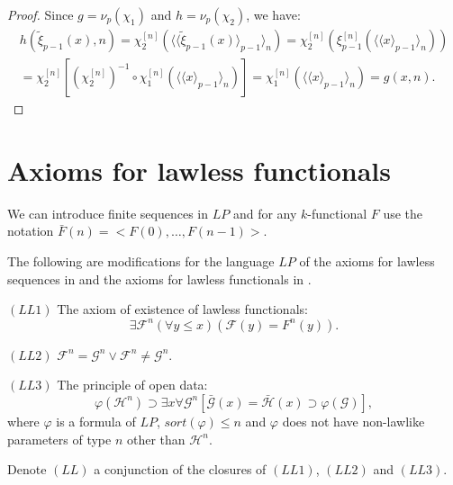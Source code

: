 \documentclass{asl}
\theoremstyle{definition}
\begin{document}
\begin{proof}
Since $g=\nu_p(\chi_1)$ and $ h=\nu_p(\chi_2) $, we have: 
\begin{multline*}
h\left( \tilde{\xi}_{p-1}(x),n \right)= \chi_2^{[n]}\left(\langle \langle \tilde{\xi}_{p-1}(x)\rangle_{p-1}\rangle_n\right)=\chi_2^{[n]}\left(\xi_{p-1}^{[n]}\left(\langle \langle x\rangle_{p-1}\rangle_n \right)\right)\\
=\chi_2^{[n]}\left[\left(\chi_2^{[n]} \right)^{-1}\circ\chi_1^{[n]} \left(\langle \langle x\rangle_{p-1}\rangle_n  \right)\right]
=\chi_1^{[n]} \left(\langle \langle x\rangle_{p-1}\rangle_n \right)=g(x,n).
\end{multline*}
\end{proof}

\section{Axioms for lawless functionals}

We can introduce finite sequences in $LP$ and for any $k$-functional $F$ use the notation $\bar{F}(n)=<F(0),\ldots,F(n-1)>$.

The following are modifications for the language $ LP $ of the axioms for lawless sequences in \cite{vand78} and the axioms for lawless functionals in \cite{bern76}. 
\medskip

$ (LL1) $ The axiom of existence of lawless functionals:
\[ \exists \mathcal{F}^n (\forall y\leqslant x)(\mathcal{F}(y)=F^n(y)).\]

\medskip

$ (LL2) $ $\mathcal{F}^n =\mathcal{G}^n \vee \mathcal{F}^n\ne\mathcal{G}^n. $
\medskip

$ (LL3) $ The principle of open data:
\[\varphi(\mathcal{H}^n)\supset\exists x\forall\mathcal{G}^n [ \mathcal{\bar{G}}(x)=\mathcal{\bar{H}}(x) \supset\varphi(\mathcal{G})],\]
where $ \varphi $ is a formula of $ LP $, $sort(\varphi) \leqslant n$ and $\varphi$ does not have non-lawlike parameters of type $n$ other than $\mathcal{H}^n$.
\smallskip

Denote $ (LL) $ a conjunction of the closures of $ (LL1) $, $ (LL2) $ and $ (LL3) $.
\end{document}
